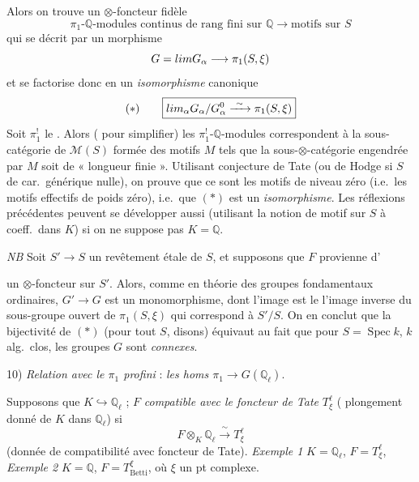 \documentclass[11pt,a4paper]{article}
\begin{document}
Alors on trouve un $\otimes$-foncteur  fidèle
\[
  \pi_{1}\text{-}\mathbb{Q}\text{-modules continus de rang fini sur }
  \mathbb{Q} \longrightarrow \text{motifs sur } S
\]
qui se décrit par un morphisme
\[
  G = \varprojlim G_{\alpha} \longrightarrow \pi_{1}(S, \xi)
\]
et se factorise donc en un \emph{isomorphisme} canonique
\[
  (*) \qquad \boxed{\varprojlim_{\alpha} G_{\alpha}/G_{\alpha}^{0}
  \xrightarrow{\ \sim\ } \pi_{1}(S, \xi)}
\]
Soit $\pi_{1}^{!}$ le \ill{} \ill{}. Alors 
 ( pour simplifier) les
$\pi_{1}^{!}$-$\mathbb{Q}$-modules correspondent à la sous-catégorie de
$\mathcal{M}(S)$ formée des motifs $M$ tels que la sous-$\otimes$-catégorie
engendrée par $M$ soit de « longueur finie ». Utilisant conjecture de Tate
(ou de Hodge si $S$ de car.\ générique nulle), on  prouve que ce
sont les motifs de niveau zéro  (i.e.\ les motifs
effectifs de poids zéro), i.e.\ que $(*)$ est un \emph{isomorphisme}. Les
 réflexions précédentes peuvent se développer aussi
(utilisant la notion de motif sur $S$ à coeff.\ dans $K$) si on ne suppose
pas $K = \mathbb{Q}$.

\struck{\ill{}}

\emph{NB} Soit $S' \to S$ un revêtement étale  de $S$,
 et supposons que $F$ provienne d'

un \struck{\ill{}} $\otimes$-foncteur  sur $S'$. Alors, comme en
théorie des groupes fondamentaux ordinaires, $G' \to G$ est un
monomorphisme, dont l'image est le  l'image inverse
 du sous-groupe ouvert de $\pi_{1}(S, \xi)$ qui correspond
à $S'/S$. On en conclut que la bijectivité de $(*)$
 (pour tout $S$, disons) équivaut
au fait que pour $S = \operatorname{Spec} k$, $k$ alg.\ clos, les groupes
$G$ sont \emph{connexes}.

10) \emph{Relation avec le $\pi_{1}$ profini} : \emph{les homs
$\pi_{1} \to G(\mathbb{Q}_{\ell})$}.

Supposons \struck{\ill{}} que $K \hookrightarrow \mathbb{Q}_{\ell}$ ;
  $F$  \emph{compatible avec le foncteur de Tate} $T^{\ell}_{\xi}$
( plongement donné de $K$ dans
$\mathbb{Q}_{\ell}$) si
\[
  F \otimes_{K} \mathbb{Q}_{\ell} \xrightarrow{\ \sim\ } T^{\ell}_{\xi}
\]
(donnée de compatibilité avec foncteur de Tate). \emph{Exemple 1}
$K = \mathbb{Q}_{\ell}$, $F = T^{\ell}_{\xi}$, \emph{Exemple 2}
$K = \mathbb{Q}$, $F = T^{\xi}_{\mathrm{Betti}}$, où $\xi$ un pt complexe.
\end{document}
